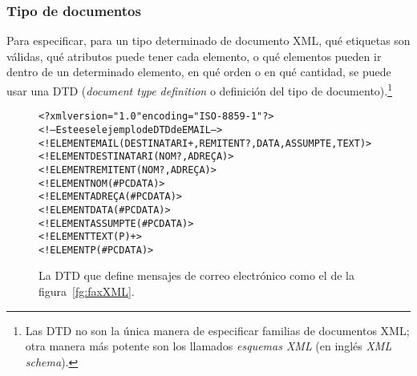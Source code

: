 \subsubsection{Tipo de documentos} Para especificar, para un tipo determinado de documento XML, qué etiquetas son válidas, qué atributos puede tener cada elemento, o qué elementos pueden ir dentro de un determinado elemento, en qué orden o en qué cantidad, se puede usar una DTD (\emph{document type definition} o definición del tipo de documento).\footnote{Las DTD no son la única manera de especificar familias de documentos XML; otra manera más potente son los llamados \emph{esquemas XML} (en inglés \emph{XML schema}).} 
\begin{figure}
\begin{center}
\begin{alltt}
<?xml version="1.0" encoding="ISO-8859-1"?>
<!-- Este es el ejemplo de DTD de EMAIL -->
<!ELEMENT EMAIL (DESTINATARI+, REMITENT?, DATA, ASSUMPTE, TEXT)>
<!ELEMENT DESTINATARI (NOM?, ADREÇA)>
<!ELEMENT REMITENT (NOM?, ADREÇA)>
<!ELEMENT NOM (#PCDATA)>
<!ELEMENT ADREÇA (#PCDATA)>
<!ELEMENT DATA (#PCDATA)>
<!ELEMENT ASSUMPTE (#PCDATA)>
<!ELEMENT TEXT (P)+>
<!ELEMENT P (#PCDATA)>
\end{alltt}
\end{center}
\caption{La DTD que define mensajes de correo electrónico como el de
  la figura~\ref{fg:faxXML}.}
\label{fg:faxDTD}
\end{figure}

